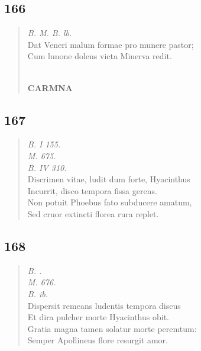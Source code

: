\documentclass[11pt, a4paper]{report}
\begin{document}
            \subsection*{166}
      \begin{verse}
      \textit{B. M. B. lb.} \\ Dat Veneri malum formae pro munere pastor; \\ Cum lunone dolens victa Minerva redit. \\ 
        ﻿\pagebreak 
     \marginpar{[150]} \begin{center} \textbf{CARMNA} \end{center}
      \end{verse}
  
            \subsection*{167}
      \begin{verse}
      \textit{B. I 155.} \\ \textit{M. 675.} \\ \textit{B. IV 310.} \\ Discrimen vitae, ludit dum forte, Hyacinthus \\ Incurrit, disco tempora fissa gerens. \\ Non potuit Phoebus fato subducere amatum, \\ Sed cruor extincti florea rura replet. \\ 
      \end{verse}
  
            \subsection*{168}
      \begin{verse}
      \textit{B. .} \\ \textit{M. 676.} \\ \textit{B. ib.} \\ Dispersit remeans ludentis tempora discus \\ Et dira pulcher morte Hyacinthus obit. \\ Gratia magna tamen solatur morte peremtum: \\ Semper Apollineus flore resurgit amor. \\ 
      \end{verse}
  
\end{document}
